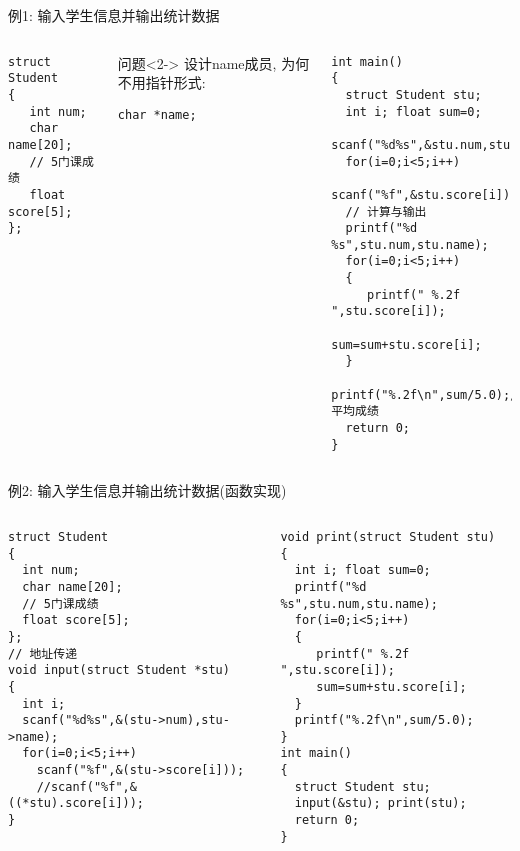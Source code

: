 \begin{frame}{例1: 输入学生信息并输出统计数据}
\vspace{-0.5cm}
\begin{columns}[T]
\begin{lstlisting}
struct Student 
{ 
   int num;
   char name[20];
   // 5门课成绩
   float score[5];
};
\end{lstlisting}
\begin{block}{问题}<2->
	设计name成员, 为何不用指针形式:
	
	\lstinline|char *name;| 
\end{block}
\begin{lstlisting}[frame=leftline]
int main()
{ 
  struct Student stu;
  int i; float sum=0;
  scanf("%d%s",&stu.num,stu.name);
  for(i=0;i<5;i++) 
     scanf("%f",&stu.score[i]); 
  // 计算与输出
  printf("%d %s",stu.num,stu.name);
  for(i=0;i<5;i++)
  { 
     printf(" %.2f ",stu.score[i]);
     sum=sum+stu.score[i];
  }
  printf("%.2f\n",sum/5.0);//平均成绩 
  return 0;
}
\end{lstlisting}
\end{columns}
\medskip
\end{frame}


\begin{frame}{例2: 输入学生信息并输出统计数据(函数实现)}
\vspace{-0.5cm}
\begin{columns}[T]
\begin{lstlisting}
struct Student 
{ 
  int num;
  char name[20];
  // 5门课成绩
  float score[5];
};
// 地址传递
void input(struct Student *stu)
{
  int i;
  scanf("%d%s",&(stu->num),stu->name);
  for(i=0;i<5;i++) 
    scanf("%f",&(stu->score[i])); 
    //scanf("%f",&((*stu).score[i]));
}
\end{lstlisting}
\begin{lstlisting}[frame=leftline]
void print(struct Student stu)
{
  int i; float sum=0;
  printf("%d %s",stu.num,stu.name);
  for(i=0;i<5;i++)
  { 
     printf(" %.2f ",stu.score[i]);
     sum=sum+stu.score[i];
  }
  printf("%.2f\n",sum/5.0);
}
int main()
{ 
  struct Student stu;
  input(&stu); print(stu); 
  return 0;
}
\end{lstlisting}
\end{columns}
\medskip
\end{frame}

